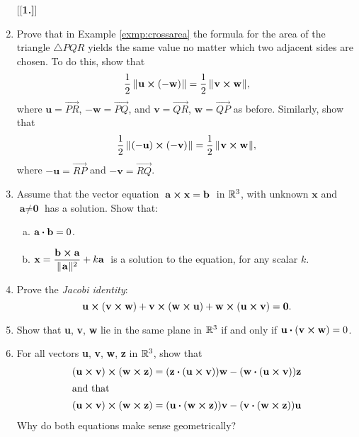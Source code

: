 \begin{enumerate}[\bfseries 1.]
[{[\bfseries 1.]}]
\item
Prove that in Example \ref{exmp:crossarea} the formula for the area of the triangle $\triangle PQR$ 
yields the same value no matter which two adjacent sides are chosen. 
To do this, show that
\[\frac{1}{2}\,\lVert\mspace{1mu}\textbf{u} \bm{\times} (-\textbf{w})\mspace{1mu}\rVert = \frac{1}{2}\,\lVert\mspace{1mu}\textbf{v} \bm{\times} \textbf{w}\mspace{1mu}\rVert,\]
where 
$\textbf{u} = \overrightarrow{PR}$, 
$-\textbf{w} = \overrightarrow{PQ}$, 
and $\textbf{v} = \overrightarrow{QR}$, 
$\textbf{w} = \overrightarrow{QP}$ as before. 
Similarly, show that
\[\frac{1}{2}\,\lVert\mspace{1mu}(-\textbf{u}) \bm{\times} (-\textbf{v})\mspace{1mu}\rVert =
  \frac{1}{2}\,\lVert\mspace{1mu}\textbf{v} \bm{\times} \textbf{w}\mspace{1mu}\rVert,\] 
where 
$-\textbf{u} = \overrightarrow{RP}$ 
and $-\textbf{v} = \overrightarrow{RQ}$.
\item 
Assume that the vector equation $\thickspace\textbf{a} \bm{\times} \textbf{x} = \textbf{b}\thickspace$ in $\mathbb{R}^{3}$, 
with unknown $\textbf{x}$ and $\textbf{a} \ne \textbf{0}$ has a solution.
Show that:
  \begin{enumerate}[(a)]
   \item $\textbf{a} \bm{\cdot} \textbf{b} = 0$.
   \item $\textbf{x} = \dfrac{\textbf{b} \bm{\times} \textbf{a}}{\lVert\mspace{1mu}\textbf{a}\mspace{1mu}\rVert^2} + k \textbf{a}\thickspace$
   is a solution to the equation, for any scalar $k$.
  \end{enumerate}
 \item Prove the \emph{Jacobi identity}:
  \[\textbf{u} \bm{\times} (\textbf{v} \bm{\times} \textbf{w}) +
  \textbf{v} \bm{\times} (\textbf{w} \bm{\times} \textbf{u}) +
  \textbf{w} \bm{\times} (\textbf{u} \bm{\times} \textbf{v}) = \textbf{0}.\]
 \item Show that \textbf{u}, \textbf{v}, \textbf{w} lie in the same plane in $\mathbb{R}^{3}$ if and only if
  $\textbf{u} \bm{\cdot} (\textbf{v} \bm{\times} \textbf{w}) = 0$.
 \item For all vectors \textbf{u}, \textbf{v}, \textbf{w}, \textbf{z} in $\mathbb{R}^{3}$, show that
  \begin{align*}
   (\textbf{u} \bm{\times} \textbf{v}) \bm{\times} (\textbf{w} \bm{\times} \textbf{z}) &=
    (\textbf{z} \bm{\cdot} (\textbf{u} \bm{\times} \textbf{v}))\textbf{w} -
    (\textbf{w} \bm{\cdot} (\textbf{u} \bm{\times} \textbf{v}))\textbf{z}\\
   \intertext{and that}
   (\textbf{u} \bm{\times} \textbf{v}) \bm{\times} (\textbf{w} \bm{\times} \textbf{z}) &=
    (\textbf{u} \bm{\cdot} (\textbf{w} \bm{\times} \textbf{z}))\textbf{v} -
    (\textbf{v} \bm{\cdot} (\textbf{w} \bm{\times} \textbf{z}))\textbf{u}
  \end{align*}
  Why do both equations make sense geometrically?
\end{enumerate}



